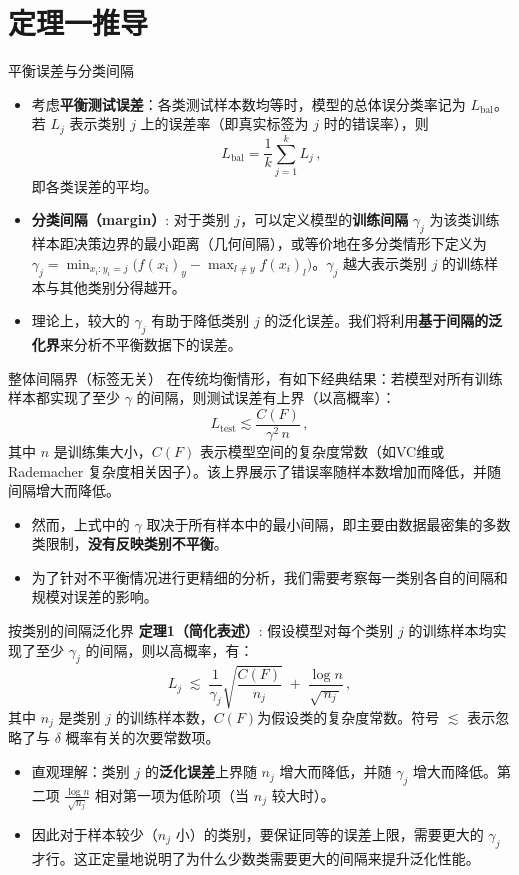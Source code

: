 \documentclass{beamer}
\begin{document}
\section{定理一推导}
\begin{frame}{平衡误差与分类间隔}
    \begin{itemize}
        \item 考虑\textbf{平衡测试误差}：各类测试样本数均等时，模型的总体误分类率记为 $L_{\text{bal}}$。若 $L_j$ 表示类别 $j$ 上的误差率（即真实标签为 $j$ 时的错误率），则 
        \[
            L_{\text{bal}} = \frac{1}{k}\sum_{j=1}^k L_j\,,
        \] 
        即各类误差的平均。
        \item \textbf{分类间隔（margin）}: 对于类别 $j$，可以定义模型的\textbf{训练间隔} $\gamma_j$ 为该类训练样本距决策边界的最小距离（几何间隔），或等价地在多分类情形下定义为 $\gamma_j = \min_{x_i:y_i=j}\big(f(x_i)_y - \max_{l \neq y}f(x_i)_l\big)$。$\gamma_j$ 越大表示类别 $j$ 的训练样本与其他类别分得越开。
        \item 理论上，较大的 $\gamma_j$ 有助于降低类别 $j$ 的泛化误差。我们将利用\textbf{基于间隔的泛化界}来分析不平衡数据下的误差。
    \end{itemize}
\end{frame}

\begin{frame}{整体间隔界（标签无关）}
    在传统均衡情形，有如下经典结果：若模型对所有训练样本都实现了至少 $\gamma$ 的间隔，则测试误差有上界（以高概率）：
    \[
        L_{\text{test}} \lesssim \frac{C(F)}{\gamma^2\,n}\,,
    \] 
    其中 $n$ 是训练集大小，$C(F)$ 表示模型空间的复杂度常数（如VC维或 Rademacher 复杂度相关因子）。该上界展示了错误率随样本数增加而降低，并随间隔增大而降低。
    \begin{itemize}
        \item 然而，上式中的 $\gamma$ 取决于所有样本中的最小间隔，即主要由数据最密集的多数类限制，\textbf{没有反映类别不平衡}。
        \item 为了针对不平衡情况进行更精细的分析，我们需要考察每一类别各自的间隔和规模对误差的影响。
    \end{itemize}
\end{frame}

\begin{frame}{按类别的间隔泛化界}
    \textbf{定理1（简化表述）}: 假设模型对每个类别 $j$ 的训练样本均实现了至少 $\gamma_j$ 的间隔，则以高概率，有：
    \[
        L_j \;\lesssim\; \frac{1}{\gamma_j}\sqrt{\frac{C(F)}{\,n_j\,}} \;+\; \frac{\log n}{\sqrt{\,n_j\,}}\,,
    \] 
    其中 $n_j$ 是类别 $j$ 的训练样本数，$C(F)$为假设类的复杂度常数。符号 $\lesssim$ 表示忽略了与 $\delta$ 概率有关的次要常数项。
    \begin{itemize}
        \item 直观理解：类别 $j$ 的\textbf{泛化误差}上界随 $n_j$ 增大而降低，并随 $\gamma_j$ 增大而降低。第二项 $\frac{\log n}{\sqrt{n_j}}$ 相对第一项为低阶项（当 $n_j$ 较大时）。
        \item 因此对于样本较少（$n_j$ 小）的类别，要保证同等的误差上限，需要更大的 $\gamma_j$ 才行。这正定量地说明了为什么少数类需要更大的间隔来提升泛化性能。
    \end{itemize}
\end{frame}
\end{document}
